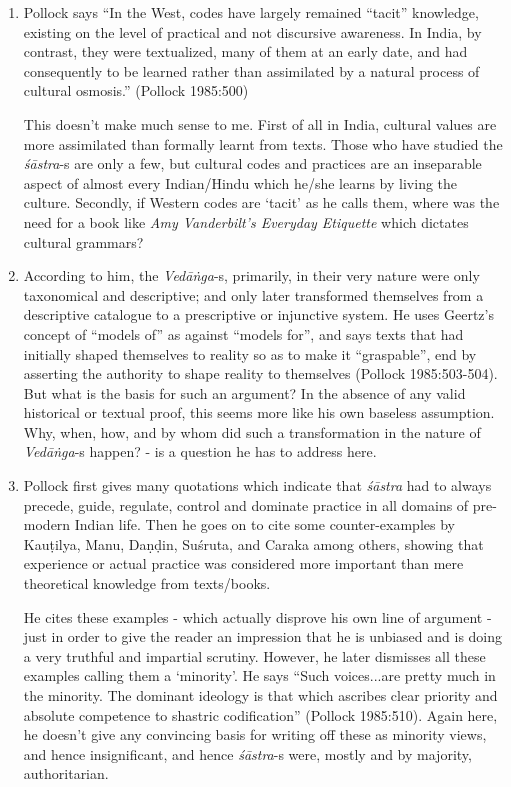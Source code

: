 \begin{enumerate}
\item Pollock says ``In the West, codes have largely remained ``tacit'' knowledge, existing on the level of practical and not discursive awareness. In India, by contrast, they were textualized, many of them at an early date, and had consequently to be learned rather than assimilated by a natural process of cultural osmosis.'' (Pollock 1985:500) 

This doesn't make much sense to me. First of all in India, cultural values are more assimilated than formally learnt from texts. Those who have studied the {\sl śāstra}-s are only a few, but cultural codes and practices are an inseparable aspect of almost every Indian/Hindu which he/she learns by living the culture.  Secondly, if Western codes are `tacit' as he calls them, where was the need for a book like {\sl Amy Vanderbilt's Everyday Etiquette} which dictates cultural grammars?

\item According to him, the {\sl Vedāṅga}-s, primarily, in their very nature were only taxonomical and descriptive; and only later transformed themselves from a descriptive catalogue to a prescriptive or injunctive system. He uses Geertz's concept of ``models of'' as against ``models for'', and says texts that had initially shaped themselves to reality so as to make it ``graspable'', end by asserting the authority to shape reality to themselves (Pollock 1985:503-504). But what is the basis for such an argument? In the absence of any valid historical or textual proof, this seems more like his own baseless assumption. Why, when, how, and by whom did such a transformation in the nature of {\sl Vedāṅga}-s happen? - is a question he has to address here.

\item Pollock first gives many quotations which indicate that {\sl śāstra} had to always precede, guide, regulate, control and dominate practice in all domains of pre-modern Indian life. Then he goes on to cite some counter-examples by Kauṭilya, Manu, Daṇḍin, Suśruta, and Caraka among others, showing that experience or actual practice was considered more important than mere theoretical knowledge from texts/books. 

He cites these examples - which actually disprove his own line of argument - just in order to give the reader an impression that he is unbiased and is doing a very truthful and impartial scrutiny. However, he later dismisses all these examples calling them a `minority'. He says ``Such voices...are pretty much in the minority. The dominant ideology is that which ascribes clear priority and absolute competence to shastric codification'' (Pollock 1985:510). Again here, he doesn't give any convincing basis for writing off these as minority views, and hence insignificant, and hence {\sl śāstra}-s were, mostly and by majority, authoritarian. 
\end{enumerate}

